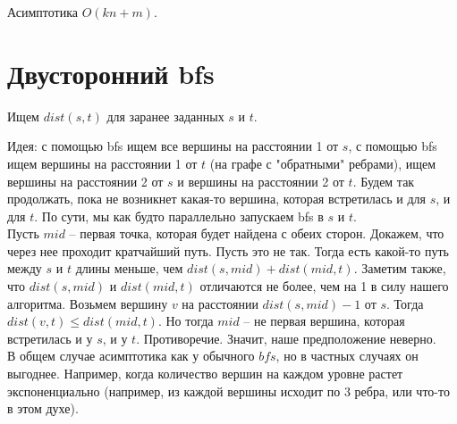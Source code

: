 

Асимптотика $O(kn + m)$.

\setcounter{section}{46}
\section{Двусторонний bfs}

Ищем $dist(s, t)$ для заранее заданных $s$ и $t$.

Идея: с помощью bfs ищем все вершины на расстоянии 1 от  $s$, с помощью bfs ищем вершины на расстоянии 1 от $t$ (на графе с "обратными" ребрами), ищем вершины на расстоянии 2 от $s$ и вершины на расстоянии 2 от $t$. Будем так продолжать, пока не возникнет какая-то вершина, которая встретилась и для $s$, и для $t$. По сути, мы как будто параллельно запускаем bfs в $s$ и $t$.\\

Пусть $mid$ -- первая точка, которая будет найдена с обеих сторон. Докажем, что через нее проходит кратчайший путь. Пусть это не так. Тогда есть какой-то путь между $s$ и $t$ длины меньше, чем $dist(s, mid) + dist(mid, t)$. Заметим также, что $dist(s, mid)$ и $dist(mid, t)$ отличаются не более, чем на 1 в силу нашего алгоритма. Возьмем вершину $v$ на расстоянии $dist(s, mid) - 1$ от $s$. Тогда $dist(v, t) \leq dist(mid, t)$. Но тогда $mid$ -- не первая вершина, которая встретилась и у $s$, и у $t$. Противоречие. Значит, наше предположение неверно.\\

В общем случае асимптотика как у обычного $bfs$, но в частных случаях он выгоднее. Например, когда количество вершин на каждом уровне растет экспоненциально (например, из каждой вершины исходит по 3 ребра, или что-то в этом духе).